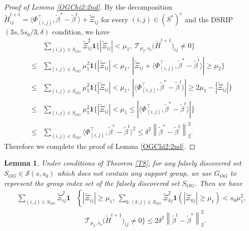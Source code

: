 \documentclass[12pt]{article}
\newtheorem{lemma}{Lemma}
\newtheorem{proof}{Proof}
\begin{document}
\begin{appendix}
\begin{proof}[Proof of Lemma \ref{OGChi2:2nd}]
    By the decomposition $\tilde H_{ij}^{t+1} = \langle{\Phi}_{(i,j)}^\top, \tilde \beta^* - \tilde\beta^{t} \rangle + \tilde \Xi_{ij}$ for every $ (i,j) \in (S^*)^c$ and the DSRIP$(3s,5s_0/3,\delta)$ condition, we have
    \begin{equation}
        \begin{aligned}\label{ElementXifailHsuccess}
        & \sum_{(i,j) \in S_{OG}} \tilde \Xi_{ij}^2\mathbf1\Big\{|\tilde \Xi_{ij}|< \mu_1,
         ~ \mathcal T_{\mu_{2},s_0} \big(\tilde H^{t+1}\big)_{ij}\ne 0\Big\}\\
        \le & \sum_{(i,j) \in S_{OG}} \mu_1^2\mathbf1\Big\{|\tilde \Xi_{ij}|< \mu_1,  ~ |\tilde \Xi_{ij}+ \langle{\Phi}_{(i,j)}^\top, \tilde \beta^* - \tilde\beta^{t} \rangle| \ge \mu_2 \Big\}\\
        \le & \sum_{(i,j) \in S_{OG}} \mu_1^2\mathbf1\Big\{|\tilde \Xi_{ij}|< \mu_1,  ~ |\langle{\Phi}_{(i,j)}^\top, \tilde \beta^* - \tilde\beta^{t} \rangle| \ge 2\mu_1-|\tilde \Xi_{ij}| \Big\}\\
        \le & \sum_{(i,j) \in S_{OG}} \mu_1^2 \mathbf1\Big\{|\tilde \Xi_{ij}|< \mu_1 \le |\langle{\Phi}_{(i,j)}^\top, \tilde \beta^* - \tilde\beta^{t} \rangle|  \Big\}\\
        \le & \sum_{(i,j) \in S_{OG} } \langle {\Phi}_{(i,j)}^\top, \tilde \beta^* -\tilde \beta^t \rangle^2
        \le  \delta^2 \left\|  \tilde \beta^* -\tilde \beta^t \right\|_2^2.
        \end{aligned}
    \end{equation}
    Therefore we complete the proof of Lemma \ref{OGChi2:2nd}. 
\end{proof}

\begin{lemma}\label{OGChi2:3rd}
    Under conditions of Theorem \ref{T8}, for any falsely discovered set $S_{OG} \in \mathcal S(s,s_0)$ which does not contain any support group, we use $G_{OG}$ to represent the group index set of the falsely discovered set $S_{OG}$. 
    Then we have
\begin{align*}\label{eq:exactOGChi2:3rd}
\sum_{(i,j) \in S_{OG}} \tilde \Xi_{ij}^2\mathbf1 &\left\{|\tilde \Xi_{ij}|\ge \mu_1,
   ~ \sum_{k: (k,j) \in S_{OG}} \tilde \Xi_{kj}^2 \mathbf1 (|\tilde \Xi_{kj}|\ge \mu_1)< s_0\mu_1^2,\right.\\
   & \quad ~ \mathcal T_{\mu_{2},s_0} \big(\tilde H^{t+1}\big)_{ij}\ne 0 \Big\} 
 \le 2 \delta^2 \left\| \tilde \beta^t - \tilde \beta^* \right\|_2^2. 
\end{align*} 
\end{lemma}


\end{appendix}
\end{document}
